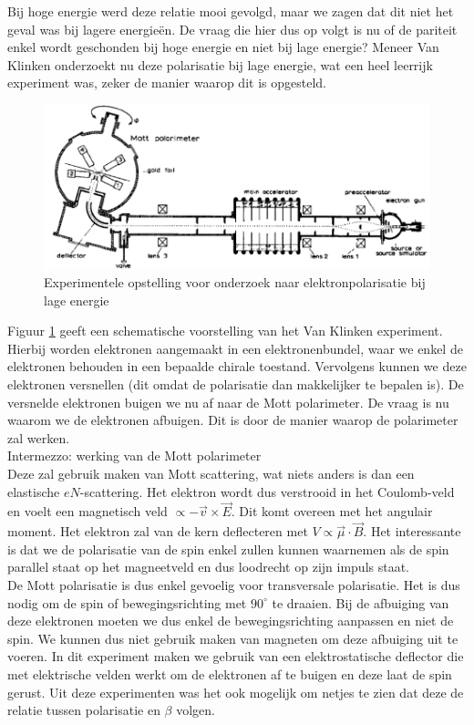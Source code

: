 \documentclass[../main.tex]{subfiles}
\begin{document}
Bij hoge energie werd deze relatie mooi gevolgd, maar we zagen dat dit niet het geval was bij lagere energieën. De vraag die hier dus op volgt is nu of de pariteit enkel wordt geschonden bij hoge energie en niet bij lage energie? Meneer Van Klinken onderzoekt nu deze polarisatie bij lage energie, wat een heel leerrijk experiment was, zeker de manier waarop dit is opgesteld.

\begin{figure}[h]
    \centering
    \includegraphics[width=0.8\linewidth]{parity_violation/van_klinken.png}
    \caption{Experimentele opstelling voor onderzoek naar elektronpolarisatie bij lage energie}%
    \label{fig:parity_violation/van_klinken}
\end{figure}

Figuur \ref{fig:parity_violation/van_klinken} geeft een schematische voorstelling van het Van Klinken experiment. Hierbij worden elektronen aangemaakt in een elektronenbundel, waar we enkel de elektronen behouden in een bepaalde chirale toestand. Vervolgens kunnen we deze elektronen versnellen (dit omdat de polarisatie dan makkelijker te bepalen is). De versnelde elektronen buigen we nu af naar de Mott polarimeter. De vraag is nu waarom we de elektronen afbuigen. Dit is door de manier waarop de polarimeter zal werken.\\
{\color{blue} Intermezzo: werking van de Mott polarimeter\\
    Deze zal gebruik maken van Mott scattering, wat niets anders is dan een elastische $eN$-scattering. Het elektron wordt dus verstrooid in het Coulomb-veld en voelt een magnetisch veld $\propto -\vec{v}\times \vec{E}$. Dit komt overeen met het angulair moment. Het elektron zal van de kern deflecteren met $V \propto \vec{\mu} \cdot \vec{B}$. Het interessante is dat we de polarisatie van de spin enkel zullen kunnen waarnemen als de spin parallel staat op het magneetveld en dus loodrecht op zijn impuls staat.\\
    De Mott polarisatie is dus enkel gevoelig voor transversale polarisatie. Het is dus nodig om de spin of bewegingsrichting met $90^\circ$ te draaien.
}
Bij de afbuiging van deze elektronen moeten we dus enkel de bewegingsrichting aanpassen en niet de spin. We kunnen dus niet gebruik maken van magneten om deze afbuiging uit te voeren. In dit experiment maken we gebruik van een elektrostatische deflector die met elektrische velden werkt om de elektronen af te buigen en deze laat de spin gerust. Uit deze experimenten was het ook mogelijk om netjes te zien dat deze de relatie tussen polarisatie en $\beta$ volgen.
\end{document}
